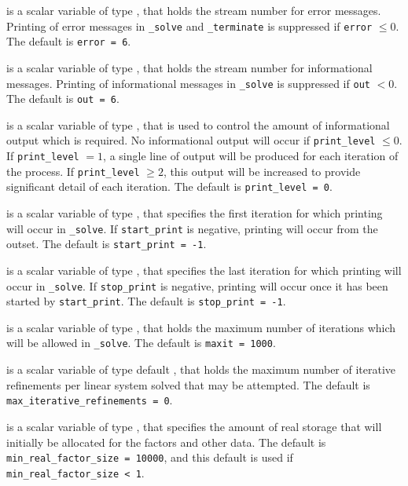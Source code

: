 \begin{description}

 is a scalar variable of type \integer, that holds the
stream number for error messages. Printing of error messages in
{\tt \packagename\_solve} and {\tt \packagename\_terminate} is suppressed if
{\tt error} $\leq 0$.
The default is {\tt error = 6}.

 is a scalar variable of type \integer, that holds the
stream number for informational messages. Printing of informational messages in
{\tt \packagename\_solve} is suppressed if {\tt out} $< 0$.
The default is {\tt out = 6}.

 is a scalar variable of type \integer, that is used
to control the amount of informational output which is required. No
informational output will occur if {\tt print\_level} $\leq 0$. If
{\tt print\_level} $= 1$, a single line of output will be produced for each
iteration of the process. If {\tt print\_level} $\geq 2$, this output will be
increased to provide significant detail of each iteration.
The default is {\tt print\_level = 0}.

 is a scalar variable of type \integer, that specifies
the first iteration for which printing will occur in {\tt \packagename\_solve}.
If {\tt start\_print} is negative, printing will occur from the outset.
The default is {\tt start\_print = -1}.

 is a scalar variable of type \integer, that specifies
the last iteration for which printing will occur in  {\tt \packagename\_solve}.
If {\tt stop\_print} is negative, printing will occur once it has been
started by {\tt start\_print}.
The default is {\tt stop\_print = -1}.

 is a scalar variable of type \integer, that holds the
maximum number of iterations which will be allowed in {\tt \packagename\_solve}.
The default is {\tt maxit = 1000}.

 is a scalar variable of type default
\integer, that holds
the maximum number of iterative refinements per linear system solved
that may be attempted.
The default is {\tt max\_iterative\_refinements = 0}.

 is a scalar variable of type \integer,
that specifies the amount of real storage that will initially be
allocated for the factors and other data.
The default is {\tt min\_real\_factor\_size = 10000},
and this default is used if {\tt min\_real\_factor\_size < 1}.


\end{description}
